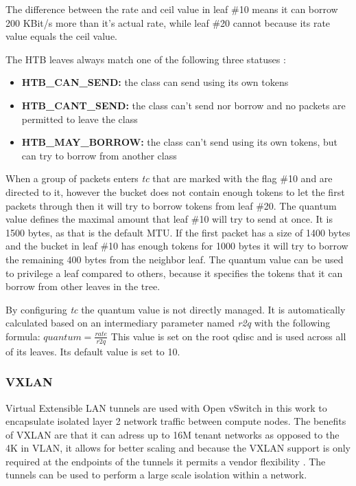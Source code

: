 The difference between the rate and ceil value in leaf \#10 means it can borrow 200 KBit/s more than it's actual rate, while leaf \#20 cannot because its rate value equals the ceil value.

The HTB leaves always match one of the following three statuses \cite{htb-qdiscs}:
\begin{itemize}
\item \textbf{HTB\_CAN\_SEND:} the class can send using its own tokens
\item \textbf{HTB\_CANT\_SEND:} the class can't send nor borrow and no packets are permitted to leave the class
\item \textbf{HTB\_MAY\_BORROW:} the class can't send using its own tokens, but can try to borrow from another class
\end{itemize}

When a group of packets enters \textit{tc} that are marked with the flag \#10 and are directed to it, however the bucket does not contain enough tokens to let the first packets through then it will try to borrow tokens from leaf \#20. The quantum value defines the maximal amount that leaf \#10 will try to send at once. It is 1500 bytes, as that is the default MTU. If the first packet has a size of 1400 bytes and the bucket in leaf \#10 has enough tokens for 1000 bytes it will try to borrow the remaining 400 bytes from the neighbor leaf. The quantum value can be used to privilege a leaf compared to others, because it specifies the tokens that it can borrow from other leaves in the tree.

By configuring \textit{tc} the quantum value is not directly managed. It is automatically calculated based on an intermediary parameter named \textit{r2q} with the following formula:  $ quantum = \frac{rate}{r2q} $ This value is set on the root qdisc and is used across all of its leaves. Its default value is set to 10.


\subsubsection{VXLAN}

Virtual Extensible LAN tunnels are used with Open vSwitch in this work to encapsulate isolated layer 2 network traffic between compute nodes. The benefits of VXLAN are that it can adress up to 16M tenant networks as opposed to the 4K in VLAN, it allows for better scaling and because the VXLAN support is only required at the endpoints of the tunnels it permits a vendor flexibility \cite{openstack-vxlan}. The tunnels can be used to perform a large scale isolation within a network.


